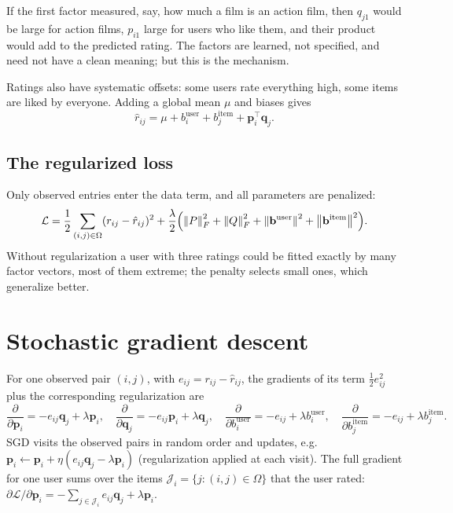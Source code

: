 \begin{notechapter}
\begin{intuition}
If the first factor measured, say, how much a film is an action film, then $q_{j1}$ would be
large for action films, $p_{i1}$ large for users who like them, and their product would add to
the predicted rating. The factors are learned, not specified, and need not have a clean
meaning; but this is the mechanism.
\end{intuition}

Ratings also have systematic offsets: some users rate everything high, some items are liked
by everyone. Adding a global mean $\mu$ and biases gives
\[
  \hat r_{ij} = \mu + b_i^{\text{user}} + b_j^{\text{item}} + \mathbf p_i^\top\mathbf q_j .
\]

\subsection{The regularized loss}

Only observed entries enter the data term, and all parameters are penalized:
\[
  \mathcal L = \frac12\sum_{(i,j)\in\Omega}(r_{ij} - \hat r_{ij})^2
  + \frac\lambda2\Bigl(\left\|P\right\|_F^2 + \left\|Q\right\|_F^2 + \left\|\mathbf b^{\text{user}}\right\|^2 + \left\|\mathbf b^{\text{item}}\right\|^2\Bigr).
\]
Without regularization a user with three ratings could be fitted exactly by many factor
vectors, most of them extreme; the penalty selects small ones, which generalize better.

\section{Stochastic gradient descent}\label{matrix-factorization:sec:sgd}

For one observed pair $(i,j)$, with $e_{ij} = r_{ij} - \hat r_{ij}$, the gradients of its term
$\frac12e_{ij}^2$ plus the corresponding regularization are
\[
  \frac{\partial}{\partial\mathbf p_i} = -e_{ij}\mathbf q_j + \lambda\mathbf p_i,\quad
  \frac{\partial}{\partial\mathbf q_j} = -e_{ij}\mathbf p_i + \lambda\mathbf q_j,\quad
  \frac{\partial}{\partial b_i^{\text{user}}} = -e_{ij} + \lambda b_i^{\text{user}},\quad
  \frac{\partial}{\partial b_j^{\text{item}}} = -e_{ij} + \lambda b_j^{\text{item}} .
\]
SGD visits the observed pairs in random order and updates, e.g.
$\mathbf p_i\leftarrow\mathbf p_i + \eta(e_{ij}\mathbf q_j - \lambda\mathbf p_i)$ (regularization applied at each visit). The full
gradient for one user sums over the items $\mathcal J_i = \{j : (i,j)\in\Omega\}$ that the user rated:
$\partial\mathcal L/\partial\mathbf p_i = -\sum_{j\in\mathcal J_i}e_{ij}\mathbf q_j + \lambda\mathbf p_i$.


\end{notechapter}
